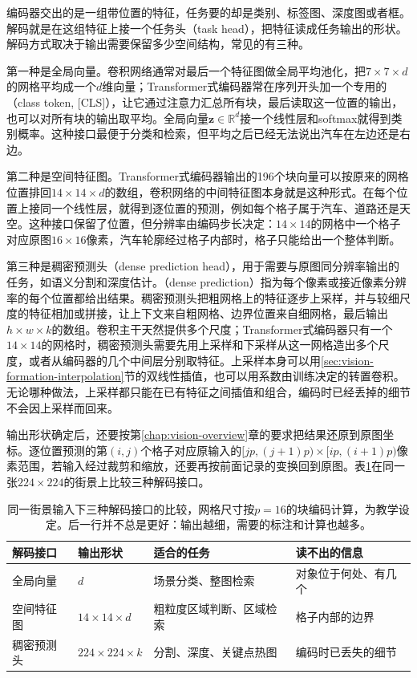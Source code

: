 编码器交出的是一组带位置的特征，任务要的却是类别、标签图、深度图或者框。解码就是在这组特征上接一个任务头（task head），把特征读成任务输出的形状。解码方式取决于输出需要保留多少空间结构，常见的有三种。

第一种是全局向量。卷积网络通常对最后一个特征图做全局平均池化，把$7\times7\times d$的网格平均成一个$d$维向量；Transformer式编码器常在序列开头加一个专用的（class token, [CLS]），让它通过注意力汇总所有块，最后读取这一位置的输出，也可以对所有块的输出取平均。全局向量$\bm z\in\mathbb R^{d}$接一个线性层和softmax就得到类别概率。这种接口最便于分类和检索，但平均之后已经无法说出汽车在左边还是右边。

第二种是空间特征图。Transformer式编码器输出的196个块向量可以按原来的网格位置排回$14\times14\times d$的数组，卷积网络的中间特征图本身就是这种形式。在每个位置上接同一个线性层，就得到逐位置的预测，例如每个格子属于汽车、道路还是天空。这种接口保留了位置，但分辨率由编码步长决定：$14\times14$的网格中一个格子对应原图$16\times16$像素，汽车轮廓经过格子内部时，格子只能给出一个整体判断。

第三种是稠密预测头（dense prediction head），用于需要与原图同分辨率输出的任务，如语义分割和深度估计。（dense prediction）指为每个像素或接近像素分辨率的每个位置都给出结果。稠密预测头把粗网格上的特征逐步上采样，并与较细尺度的特征相加或拼接，让上下文来自粗网格、边界位置来自细网格，最后输出$h\times w\times k$的数组。卷积主干天然提供多个尺度；Transformer式编码器只有一个$14\times14$的网格时，稠密预测头需要先用上采样和下采样从这一网格造出多个尺度，或者从编码器的几个中间层分别取特征。上采样本身可以用\ref{sec:vision-formation-interpolation}节的双线性插值，也可以用系数由训练决定的转置卷积。无论哪种做法，上采样都只能在已有特征之间插值和组合，编码时已经丢掉的细节不会因上采样而回来。

输出形状确定后，还要按第\ref{chap:vision-overview}章的要求把结果还原到原图坐标。逐位置预测的第$(i,j)$个格子对应原输入的$[jp,(j+1)p)\times[ip,(i+1)p)$像素范围，若输入经过裁剪和缩放，还要再按前面记录的变换回到原图。表\ref{tab:vision-ivm-output-forms}在同一张$224\times224$的街景上比较三种解码接口。

\begin{table}[htbp]
  \centering
  \small
  \begin{tabularx}{\linewidth}{@{}p{20mm}p{26mm}XX@{}}
    \toprule
    解码接口 & 输出形状 & 适合的任务 & 读不出的信息\\
    \midrule
    全局向量 & $d$ & 场景分类、整图检索 & 对象位于何处、有几个\\
    空间特征图 & $14\times14\times d$ & 粗粒度区域判断、区域检索 & 格子内部的边界\\
    稠密预测头 & $224\times224\times k$ & 分割、深度、关键点热图 & 编码时已丢失的细节\\
    \bottomrule
  \end{tabularx}
  \caption{同一街景输入下三种解码接口的比较，网格尺寸按$p=16$的块编码计算，为教学设定。后一行并不总是更好：输出越细，需要的标注和计算也越多。}
  \label{tab:vision-ivm-output-forms}
\end{table}
\FloatBarrier

